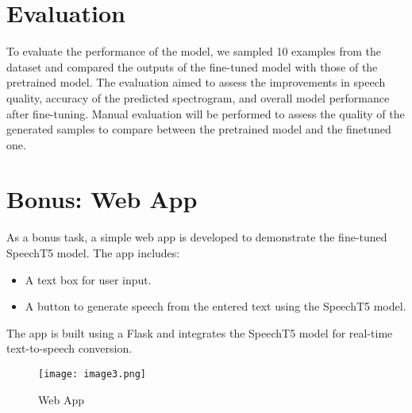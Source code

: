 \documentclass[12pt]{article}
\begin{document}
\section*{Evaluation}
To evaluate the performance of the model, we sampled 10 examples from the dataset and compared the outputs of the fine-tuned model with those of the pretrained model. The evaluation aimed to assess the improvements in speech quality, accuracy of the predicted spectrogram, and overall model performance after fine-tuning.
Manual evaluation will be performed to assess the quality of the generated samples to compare between the pretrained model and the finetuned one.




\vspace{1cm}
\vspace{1cm}
\section*{Bonus: Web App}
As a bonus task, a simple web app is developed to demonstrate the fine-tuned SpeechT5 model. The app includes:
\begin{itemize}
\item A text box for user input.
\item A button to generate speech from the entered text using the SpeechT5 model.
\end{itemize}
The app is built using a Flask and integrates the SpeechT5 model for real-time text-to-speech conversion.
\vspace{1cm}
\vspace{1cm}

\begin{figure}[h]
    \centering
    \texttt{[image: image3.png]}
    \caption{Web App}
    \label{fig:enter-label}
\end{figure}
\end{document}
